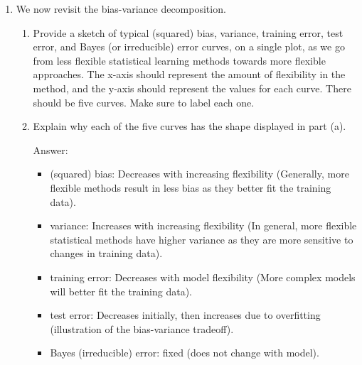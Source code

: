 \documentclass{article}
\begin{document}
\begin{enumerate}
\begin{enumerate}
Answer: $n=500$, $p=3$, regression, inference.

\item We are considering launching a new product and wish to know whether
    it will be a success or a failure. We collect data on 20 similar products
    that were previously launched. For each product we have recorded whether it
    was a success or failure, price charged for the product, marketing budget,
    competition price, and ten other variables.

Answer: $n=20$, $p=13$, classification, prediction.

\item We are interested in predicting the \% change in the USD/Euro exchange
    rate in relation to the weekly changes in the world stock markets. Hence we
    collect weekly data for all of 2012. For each week we record the \% change
    in the USD/Euro, the \% change in the US market, the \% change in the British
    market, and the \% change in the German market.

Answer: $n=52$, $p=3$, regression, prediction.
\end{enumerate}

\item We now revisit the bias-variance decomposition.
\begin{enumerate}
\item Provide a sketch of typical (squared) bias, variance, training error,
    test error, and Bayes (or irreducible) error curves, on a single plot, as
    we go from less flexible statistical learning methods towards more flexible
    approaches. The x-axis should represent the amount of flexibility in the
   method, and the y-axis should represent the values for each curve. There
    should be five curves. Make sure to label each one.

\item  Explain why each of the five curves has the shape displayed in
    part (a).

Answer:
\begin{itemize}
\item (squared) bias: Decreases with increasing flexibility (Generally, more
  flexible methods result in less bias as they better fit the training data).
\item variance: Increases with increasing flexibility (In general, more flexible
  statistical methods have higher variance as they are more sensitive to changes in training data).
\item training error: Decreases with model flexibility (More complex models will
  better fit the training data).
\item test error: Decreases initially, then increases due to overfitting (illustration of the bias-variance tradeoff).
\item  Bayes (irreducible) error: fixed (does not change with model).
\end{itemize}
\end{enumerate}


\end{enumerate}
\end{document}

